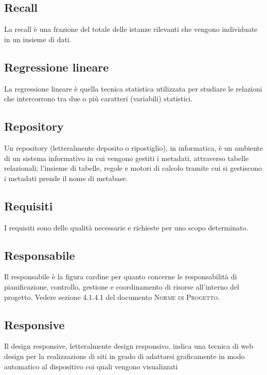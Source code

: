 

\subsection*{Recall}
La recall è una frazione del totale delle istanze rilevanti che vengono individuate in un insieme di dati.

\subsection*{Regressione lineare}
La regressione lineare è quella tecnica statistica utilizzata per studiare le relazioni che intercorrono tra due o più caratteri (variabili) statistici.

\subsection*{Repository}
Un repository (letteralmente deposito o ripostiglio), in informatica, è un ambiente di un sistema informativo  in cui vengono gestiti i metadati, attraverso tabelle relazionali; l'insieme di tabelle, regole e motori di calcolo tramite cui si gestiscono i metadati prende il nome di metabase.

\subsection*{Requisiti}
I requisiti sono delle qualità necessarie e richieste per uno scopo determinato.

\subsection*{Responsabile}
Il responsabile è la figura cardine per quanto concerne le responsabilità di pianificazione, controllo, gestione e coordinamento di risorse all’interno del progetto. Vedere sezione 4.1.4.1 del documento \textsc{Norme di Progetto}.

\subsection*{Responsive}
Il design responsive, letteralmente design responsivo, indica una tecnica di web design per la realizzazione di siti in grado di adattarsi graficamente in modo automatico al dispositivo coi quali vengono visualizzati

